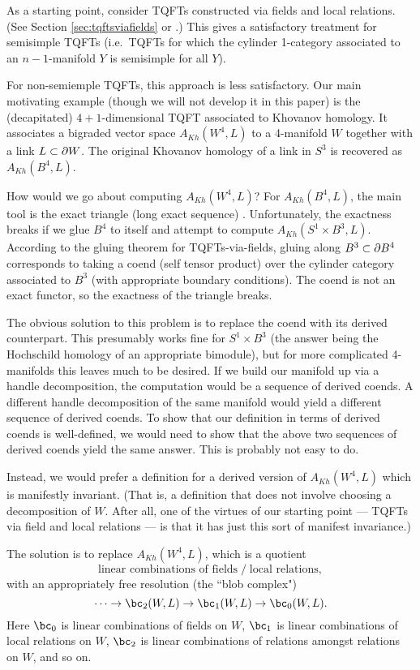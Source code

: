 As a starting point, consider TQFTs constructed via fields and local relations.
(See Section \ref{sec:tqftsviafields} or \cite{kwtqft}.)
This gives a satisfactory treatment for semisimple TQFTs
(i.e.\ TQFTs for which the cylinder 1-category associated to an
$n{-}1$-manifold $Y$ is semisimple for all $Y$).

For non-semiemple TQFTs, this approach is less satisfactory.
Our main motivating example (though we will not develop it in this paper)
is the (decapitated) $4{+}1$-dimensional TQFT associated to Khovanov homology.
It associates a bigraded vector space $A_{Kh}(W^4, L)$ to a 4-manifold $W$ together
with a link $L \subset \partial W$.
The original Khovanov homology of a link in $S^3$ is recovered as $A_{Kh}(B^4, L)$.

How would we go about computing $A_{Kh}(W^4, L)$?
For $A_{Kh}(B^4, L)$, the main tool is the exact triangle (long exact sequence)
.
Unfortunately, the exactness breaks if we glue $B^4$ to itself and attempt
to compute $A_{Kh}(S^1\times B^3, L)$.
According to the gluing theorem for TQFTs-via-fields, gluing along $B^3 \subset \partial B^4$
corresponds to taking a coend (self tensor product) over the cylinder category
associated to $B^3$ (with appropriate boundary conditions).
The coend is not an exact functor, so the exactness of the triangle breaks.


The obvious solution to this problem is to replace the coend with its derived counterpart.
This presumably works fine for $S^1\times B^3$ (the answer being the Hochschild homology
of an appropriate bimodule), but for more complicated 4-manifolds this leaves much to be desired.
If we build our manifold up via a handle decomposition, the computation
would be a sequence of derived coends.
A different handle decomposition of the same manifold would yield a different
sequence of derived coends.
To show that our definition in terms of derived coends is well-defined, we
would need to show that the above two sequences of derived coends yield the same answer.
This is probably not easy to do.

Instead, we would prefer a definition for a derived version of $A_{Kh}(W^4, L)$
which is manifestly invariant.
(That is, a definition that does not
involve choosing a decomposition of $W$.
After all, one of the virtues of our starting point --- TQFTs via field and local relations ---
is that it has just this sort of manifest invariance.)

The solution is to replace $A_{Kh}(W^4, L)$, which is a quotient
\[
 \text{linear combinations of fields} \;\big/\; \text{local relations} ,
\]
with an appropriately free resolution (the ``blob complex")
\[
	\cdots\to \bc_2(W, L) \to \bc_1(W, L) \to \bc_0(W, L) .
\]
Here $\bc_0$ is linear combinations of fields on $W$,
$\bc_1$ is linear combinations of local relations on $W$,
$\bc_2$ is linear combinations of relations amongst relations on $W$,
and so on.

